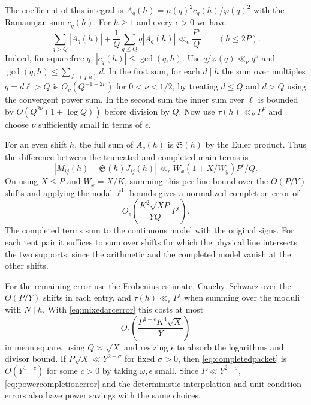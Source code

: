 \documentclass[11pt,a4paper]{article}
\numberwithin{equation}{section}
\newcommand{\SSS}{\mathfrak S}
\begin{document}
The coefficient of this integral is
$A_q(h)=\mu(q)^2c_q(h)/\varphi(q)^2$ with the Ramanujan
sum $c_q(h)$. For $h\ge1$ and every $\epsilon>0$ we have
\begin{equation}
 \sum_{q>Q}|A_q(h)|
  +\frac1Q\sum_{q\le Q}q|A_q(h)|
   \ll_\epsilon \frac{P^\epsilon}{Q}
       \qquad (h\le 2P).
 \label{eq:ramanujancompletion}
\end{equation}
Indeed, for squarefree $q$, $|c_q(h)|\le\gcd(q,h)$.
Use $q/\varphi(q)\ll_\nu q^\nu$ and
$\gcd(q,h)\le\sum_{d\mid(q,h)}d$. In the first sum, for
each $d\mid h$ the sum over multiples $q=d\ell>Q$ is
$O_\nu(Q^{-1+2\nu})$ for $0<\nu<1/2$, by treating
$d\le Q$ and $d>Q$ using the convergent power sum.
In the second sum the inner sum over $\ell$ is bounded
by $O(Q^{2\nu}(1+\log Q))$ before division by $Q$.
Now use $\tau(h)\ll_\nu P^\nu$ and choose $\nu$ sufficiently
small in terms of $\epsilon$.

For an even shift $h$, the full sum of $A_q(h)$ is $\SSS(h)$
by the Euler product. Thus the difference between the
truncated and completed main terms is
\[
 |M_{ij}(h)-\SSS(h)J_{ij}(h)|
     \ll_\epsilon W_x(1+X/W_y)P^\epsilon/Q .
\]
On using $X\le P$ and $W_x=X/K$, summing this per-line
bound over the $O(P/Y)$ shifts and applying the nodal
$\ell^1$ bounds gives a normalized completion error of
\begin{equation}
 O_\epsilon\!\left(\frac{K^2\sqrt{XP}}{YQ}P^\epsilon\right).
 \label{eq:powercompletionerror}
\end{equation}
The completed terms sum to the continuous model with the
original signs. For each tent pair it suffices to sum over
shifts for which the physical line intersects the two
supports, since the arithmetic and the completed model
vanish at the other shifts.

For the remaining error use the Frobenius estimate,
Cauchy--Schwarz over the $O(P/Y)$ shifts in each entry,
and $\tau(h)\ll_\epsilon P^\epsilon$ when summing over
the moduli with $N\mid h$. With \cref{eq:mixedarcerror}
this costs at most
\begin{equation}
 O_\epsilon\left(\frac{P^{1+\epsilon}K^4\sqrt X}{Y}\right)
 \label{eq:completedpacket}
\end{equation}
in mean square, using $Q\asymp\sqrt X$ and resizing
$\epsilon$ to absorb the logarithms and divisor bound.
If $P\sqrt X\ll Y^{2-\sigma}$ for fixed $\sigma>0$, then
\cref{eq:completedpacket} is $O(Y^{1-c})$ for some $c>0$
by taking $\omega,\epsilon$ small. Since $P\ll Y^{2-\sigma}$,
\cref{eq:powercompletionerror} and the deterministic
interpolation and unit-condition errors also have power
savings with the same choices.
\end{document}

